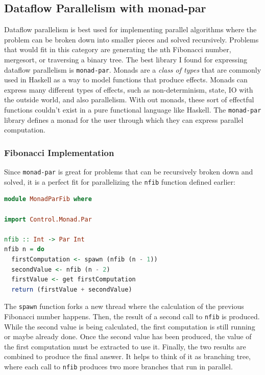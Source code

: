 \documentclass[a4paper, 10pt]{article}
\begin{document}
\subsection{Dataflow Parallelism with monad-par}

Dataflow parallelism is best used for implementing parallel algorithms where the problem can be broken down into smaller pieces and solved recursively. Problems that would fit in this category are generating the nth Fibonacci number, mergesort, or traversing a binary tree. The best library I found for expressing dataflow parallelism is \lstinline{monad-par}. Monads are a \textit{class of types} that are commonly used in Haskell as a way to model functions that produce effects. Monads can express many different types of effects, such as non-determinism, state, IO with the outside world, and also parallelism. With out monads, these sort of effectful functions couldn't exist in a pure functional language like Haskell. The \lstinline{monad-par} library defines a monad for the user through which they can express parallel computation.

\subsubsection{Fibonacci Implementation}

Since \lstinline{monad-par} is great for problems that can be recursively broken down and solved, it is  a perfect fit for parallelizing the \lstinline{nfib} function defined earlier:

\begin{lstlisting}[language=Haskell, caption=Fibonnaci using monad-par library]
module MonadParFib where

import Control.Monad.Par

nfib :: Int -> Par Int
nfib n = do
  firstComputation <- spawn (nfib (n - 1))
  secondValue <- nfib (n - 2)
  firstValue <- get firstComputation
  return (firstValue + secondValue)
\end{lstlisting}

The \lstinline{spawn} function forks a new thread where the calculation of the previous Fibonacci number happens. Then,  the result of a second call to \lstinline{nfib} is produced. While the second value is being calculated, the first computation is still running or maybe already done. Once the second value has been produced, the value of the first computation must be extracted to use it. Finally, the two results are combined to produce the final answer. It helps to think of it as branching tree, where each call to \lstinline{nfib} produces two more branches that run in parallel.
\end{document}

